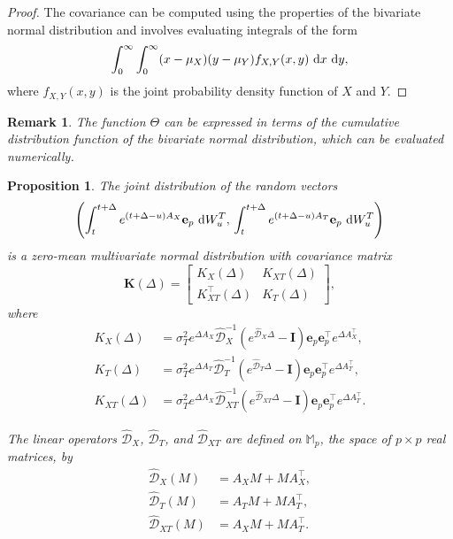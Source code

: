 \documentclass[10pt,a4paper,reqno]{amsart}
\newtheorem{remark}[theorem]{Remark}
\newtheorem{proposition}[theorem]{Proposition}
\theoremstyle{example}
\newcommand*\D{\mathop{}\!\textnormal{d}}
\begin{document}
\begin{proof}
The covariance can be computed using the properties of the bivariate normal distribution and involves evaluating integrals of the form
\[
\int_{0}^\infty \int_{0}^\infty (x - \mu_X)(y - \mu_Y) f_{X,Y}(x, y) \, \D x \, \D y,
\]
where $f_{X,Y}(x, y)$ is the joint probability density function of $X$ and $Y$.
\end{proof}

\begin{remark}
The function $\Theta$ can be expressed in terms of the cumulative distribution function of the bivariate normal distribution, which can be evaluated numerically.
\end{remark}


\begin{proposition}\label{prop:joint-distribution-integrals}
The joint distribution of the random vectors 
\[
\left( \int_t^{t+\Delta} e^{(t+\Delta - u) A_X} \mathbf{e}_p \, \D W_u^T, \, \int_t^{t+\Delta} e^{(t+\Delta - u) A_T} \mathbf{e}_p \, \D W_u^T \right)
\]
is a zero-mean multivariate normal distribution with covariance matrix
\[
\mathbf{K}(\Delta) = \begin{bmatrix}
K_X(\Delta) & K_{XT}(\Delta) \\
K_{XT}^\intercal(\Delta) & K_T(\Delta)
\end{bmatrix},
\]
where
\begin{align}
K_X(\Delta) &= \sigma_T^2 e^{\Delta A_X} \hat{\mathcal{D}}_X^{-1} \left( e^{\hat{\mathcal{D}}_X \Delta} - \mathbf{I} \right) \mathbf{e}_p \mathbf{e}_p^\intercal e^{\Delta A_X^\intercal}, \\
K_T(\Delta) &= \sigma_T^2 e^{\Delta A_T} \hat{\mathcal{D}}_T^{-1} \left( e^{\hat{\mathcal{D}}_T \Delta} - \mathbf{I} \right) \mathbf{e}_p \mathbf{e}_p^\intercal e^{\Delta A_T^\intercal}, \\
K_{XT}(\Delta) &= \sigma_T^2 e^{\Delta A_X} \hat{\mathcal{D}}_{XT}^{-1} \left( e^{\hat{\mathcal{D}}_{XT} \Delta} - \mathbf{I} \right) \mathbf{e}_p \mathbf{e}_p^\intercal e^{\Delta A_T^\intercal}.
\end{align}

The linear operators $\hat{\mathcal{D}}_X$, $\hat{\mathcal{D}}_T$, and $\hat{\mathcal{D}}_{XT}$ are defined on $\mathbb{M}_p$, the space of $p \times p$ real matrices, by
\begin{align}
\hat{\mathcal{D}}_X(M) &= A_X M + M A_X^\intercal, \\
\hat{\mathcal{D}}_T(M) &= A_T M + M A_T^\intercal, \\
\hat{\mathcal{D}}_{XT}(M) &= A_X M + M A_T^\intercal.
\end{align}
\end{proposition}
\end{document}
